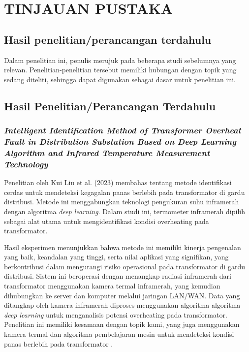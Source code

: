 \chapter{TINJAUAN PUSTAKA}

\section{Hasil penelitian/perancangan terdahulu}
Dalam penelitian ini, penulis merujuk pada beberapa studi sebelumnya yang relevan. Penelitian-penelitian tersebut memiliki hubungan dengan topik yang sedang diteliti, sehingga dapat digunakan sebagai dasar untuk penelitian ini.

\section{Hasil Penelitian/Perancangan Terdahulu}



\subsection{\emph{Intelligent Identification Method of Transformer Overheat Fault in Distribution Substation Based on Deep Learning Algorithm and Infrared Temperature Measurement Technology}}
Penelitian oleh Kui Liu et al. (2023) membahas tentang metode identifikasi cerdas untuk mendeteksi kegagalan panas berlebih pada transformator di gardu distribusi. Metode ini menggabungkan teknologi pengukuran suhu inframerah dengan algoritma \emph{deep learning}. Dalam studi ini, termometer inframerah dipilih sebagai alat utama untuk mengidentifikasi kondisi overheating pada transformator.

Hasil eksperimen menunjukkan bahwa metode ini memiliki kinerja pengenalan yang baik, keandalan yang tinggi, serta nilai aplikasi yang signifikan, yang berkontribusi dalam mengurangi risiko operasional pada transformator di gardu distribusi. Sistem ini beroperasi dengan menangkap radiasi inframerah dari transformator menggunakan kamera termal inframerah, yang kemudian dihubungkan ke server dan komputer melalui jaringan LAN/WAN. Data yang ditangkap oleh kamera inframerah diproses menggunakan algoritma algoritma \emph{deep learning} untuk menganalisis potensi overheating pada transformator. Penelitian ini memiliki kesamaan dengan topik kami, yang juga menggunakan kamera termal dan algoritma pembelajaran mesin untuk mendeteksi kondisi panas berlebih pada transformator \cite{KuiLiau2023}.

